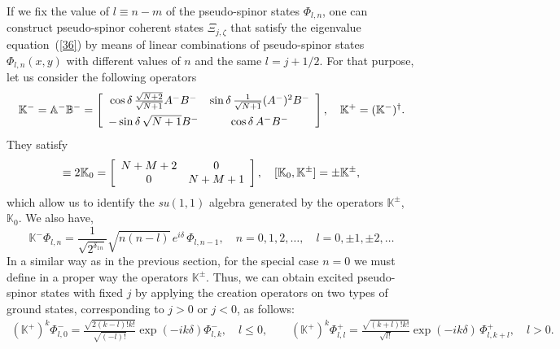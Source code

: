 \documentclass[aps,showpacs,showkeys]{revtex4}
\begin{document}
If we fix the value of $l\equiv n-m$ of the pseudo-spinor states $\Phi_{l,n}$, one can construct pseudo-spinor coherent states $\Xi_{j,\zeta}$ that satisfy the eigenvalue equation~(\ref{36}) by means of linear combinations of pseudo-spinor states $\Phi_{l,n}(x,y)$ with different values of $n$ and the same $l=j+1/2$. For that purpose, let us consider the following operators
	\begin{equation}\label{86}
 \mathbb{K}^-=\mathbb{A}^-\mathbb{B}^-=\left[\begin{array}{c c}
\cos\delta\, \frac{\sqrt{N+2}}{\sqrt{N+1}}A^-B^- & \sin\delta\, \frac{1}{\sqrt{N+1}}(A^-)^2B^- \\ [1.5ex]
-\sin\delta\, \sqrt{N+1}B^- & \cos\delta\,  A^-B^-
\end{array}\right], \quad \mathbb{K}^+=(\mathbb{K}^-)^\dagger.
\end{equation}
They satisfy
\begin{equation}
 [\mathbb{K}^-,\mathbb{K}^+]\equiv2\mathbb{K}_0=\left[\begin{array}{c c}
N+M+2 & 0 \\
0 & N+M+1
\end{array}\right], \quad [\mathbb{K}_0,\mathbb{K}^\pm]=\pm\mathbb{K}^\pm, \label{87a} 
\end{equation}
which allow us to identify the {\it su$(1,1)$} algebra generated by the operators $\mathbb{K}^\pm$, $\mathbb{K}_0$. 
We also have,
\begin{equation}
 \mathbb{K}^-\Phi_{l,n}=\frac{1}{\sqrt{2^{\delta_{1n}}}}\sqrt{n(n-l)}\,  e^{i\delta}\, \Phi_{l,n-1}, \quad n=0,1,2,\dots, \quad l=0,\pm 1,\pm 2,\dots \label{87b}
\end{equation}
In a similar way as in the previous section, for the special case $n=0$ we must define in a proper way the operators $\mathbb{K}^{\pm}$. Thus, we can obtain excited pseudo-spinor states with fixed $j$ by applying the creation operators on two types of ground states, corresponding to $j>0$ or $j<0$, as follows:
\begin{eqnarray}
(\mathbb{K}^+)^{k}\Phi_{l,0}^- =\frac{\sqrt{2(k-l)!k!}}{\sqrt{(-l)!}}\exp\left(-ik\delta\right)\Phi_{l,k}^-, \quad l\leq0, 
\qquad
(\mathbb{K}^+)^k\Phi_{l,l}^+ =\frac{\sqrt{(k+l)!k!}}{\sqrt{l!}}\exp\left(-ik\delta\right)\,\Phi_{l,k+l}^+, \quad l>0. \label{92}
\end{eqnarray}
\end{document}
